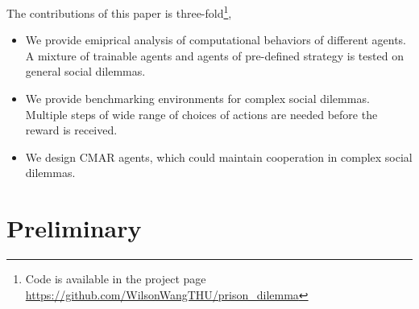 \documentclass{article}
\begin{document}
The contributions of this paper is three-fold\footnote{Code is available in the project page \url{https://github.com/WilsonWangTHU/prison_dilemma}}, 
\begin{itemize}
\item We provide emiprical analysis of computational behaviors of different agents.
A mixture of trainable agents and agents of pre-defined strategy is tested on general social dilemmas.
\item We provide benchmarking environments for complex social dilemmas.
Multiple steps of wide range of choices of actions are needed before the reward is received.
\item We design CMAR agents, which could maintain cooperation in complex social dilemmas.
\end{itemize}
% 
\section{Preliminary}
\end{document}

